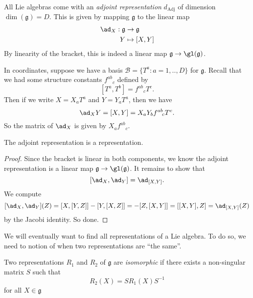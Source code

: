 \documentclass[a4paper]{article}
\begin{document}
\begin{defi}
  All Lie algebras come with an \emph{adjoint representation} $d_\mathrm{Adj}$ of dimension $\dim(\mathfrak{g}) = D$. This is given by mapping $\mathfrak{g}$ to the linear map
  \begin{align*}
    \ad_X: \mathfrak{g} &\to \mathfrak{g}\\
    Y &\mapsto [X, Y]
  \end{align*}
  By linearity of the bracket, this is indeed a linear map $\mathfrak{g} \to \gl(\mathfrak{g})$.
\end{defi}
In coordinates, suppose we have a basis $\mathcal{B} = \{T^a: a = 1, .., D\}$ for $\mathfrak{g}$. Recall that we had some structure constants $f^{ab}\!_c$ defined by
\[
  [T^a, T^b] = f^{ab}\!_c T^c.
\]
Then if we write $X = X_a T^a$ and $Y = Y_a T^a$, then we have
\[
  \ad_X Y = [X, Y] = X_a Y_b f^{ab}\!_c T^c.
\]
So the matrix of $\ad_X$ is given by $X_a f^{ab}\!_c$.

\begin{prop}
  The adjoint representation is a representation.
\end{prop}

\begin{proof}
  Since the bracket is linear in both components, we know the adjoint representation is a linear map $\mathfrak{g} \to \gl(\mathfrak{g})$. It remains to show that
  \[
    [\ad_X, \ad_Y] = \ad_{[X, Y]}.
  \]
  We compute
  \[
    [\ad_X, \ad_Y](Z) = [X, [Y, Z]] - [Y, [X, Z]] = -[Z, [X, Y]] = [[X, Y], Z] = \ad_{[X, Y]}(Z)
  \]
  by the Jacobi identity. So done.
\end{proof}

We will eventually want to find all representations of a Lie algebra. To do so, we need to notion of when two representations are ``the same''.
\begin{defi}
  Two representations $R_1$ and $R_2$ of $\mathfrak{g}$ are \emph{isomorphic} if there exists a non-singular matrix $S$ such that
  \[
    R_2(X) = SR_1(X) S^{-1}
  \]
  for all $X \in \mathfrak{g}$
\end{defi}
\end{document}
